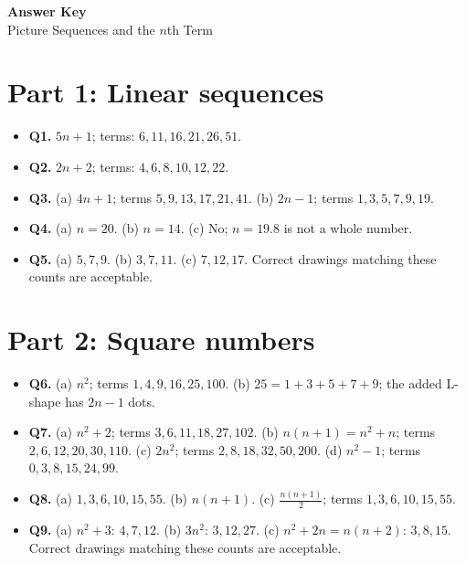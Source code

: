 \documentclass[11pt,a4paper]{article}
\begin{document}
\begin{center}
  {\Large\bfseries Answer Key}\\[2pt]
  {\large Picture Sequences and the \(n\)th Term}
\end{center}

\section*{Part 1: Linear sequences}
\begin{itemize}[leftmargin=*,itemsep=3pt]
\item \textbf{Q1.} \(5n+1\); terms: \(6,11,16,21,26,51\).
\item \textbf{Q2.} \(2n+2\); terms: \(4,6,8,10,12,22\).
\item \textbf{Q3.} (a) \(4n+1\); terms \(5,9,13,17,21,41\). (b) \(2n-1\); terms \(1,3,5,7,9,19\).
\item \textbf{Q4.} (a) \(n=20\). (b) \(n=14\). (c) No; \(n=19.8\) is not a whole number.
\item \textbf{Q5.} (a) \(5,7,9\). (b) \(3,7,11\). (c) \(7,12,17\). Correct drawings matching these counts are acceptable.
\end{itemize}

\section*{Part 2: Square numbers}
\begin{itemize}[leftmargin=*,itemsep=3pt]
\item \textbf{Q6.} (a) \(n^2\); terms \(1,4,9,16,25,100\). (b) \(25=1+3+5+7+9\); the added L-shape has \(2n-1\) dots.
\item \textbf{Q7.} (a) \(n^2+2\); terms \(3,6,11,18,27,102\). (b) \(n(n+1)=n^2+n\); terms \(2,6,12,20,30,110\). (c) \(2n^2\); terms \(2,8,18,32,50,200\). (d) \(n^2-1\); terms \(0,3,8,15,24,99\).
\item \textbf{Q8.} (a) \(1,3,6,10,15,55\). (b) \(n(n+1)\). (c) \(\frac{n(n+1)}{2}\); terms \(1,3,6,10,15,55\).
\item \textbf{Q9.} (a) \(n^2+3\): \(4,7,12\). (b) \(3n^2\): \(3,12,27\). (c) \(n^2+2n=n(n+2)\): \(3,8,15\). Correct drawings matching these counts are acceptable.
\end{itemize}
\end{document}
